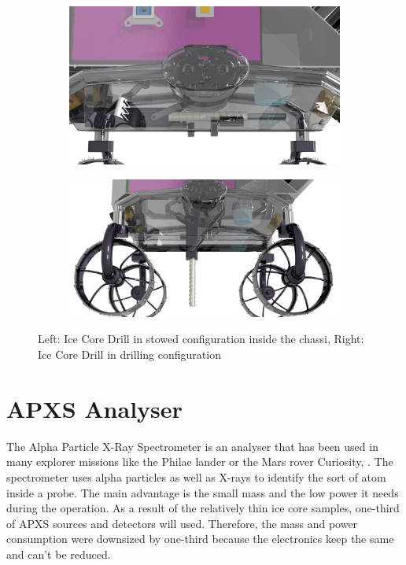 \begin{figure}[htb]
     \centering
     \begin{subfigure}[b]{0.45\textwidth}
         \centering
         \includegraphics[width=\textwidth]{Media/DrillingBay3}
         \label{fig:stowedDrill}
     \end{subfigure}
     \hfill
     \begin{subfigure}[b]{0.45\textwidth}
         \centering
         \includegraphics[width=\textwidth]{Media/DrillingBay_unfolded2}
         \label{fig:drillconfig}
     \end{subfigure}
     \hfill
     \caption{Left: Ice Core Drill in stowed configuration inside the chassi, Right: Ice Core Drill in drilling configuration}
     \label{fig:DrillBay}
\end{figure}

\section{APXS Analyser}
The Alpha Particle X-Ray Spectrometer is an analyser that has been used in many explorer missions like the Philae lander or the Mars rover Curiosity, \cite{ref_pay_1} \cite{ref_pay_2}.
The spectrometer uses alpha particles as well as X-rays to identify the sort of atom inside a probe.
The main advantage is the small mass and the  low power it needs during the operation.
As a result of the relatively thin ice core samples, one-third of APXS sources and detectors will used.
Therefore, the mass and power consumption were downsized by one-third because the electronics keep the same and can't be reduced.


